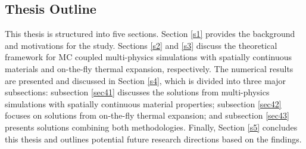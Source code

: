 \subsection{Thesis Outline}

This thesis is structured into five sections. Section \ref{s1} provides the background and motivations for the study. Sections \ref{s2} and \ref{s3} discuss the theoretical framework for MC coupled multi-physics simulations with spatially continuous materials and on-the-fly thermal expansion, respectively. The numerical results are presented and discussed in Section \ref{s4}, which is divided into three major subsections: subsection \ref{sec41} discusses the solutions from multi-physics simulations with spatially continuous material properties; subsection \ref{sec42} focuses on solutions from on-the-fly thermal expansion; and subsection \ref{sec43} presents solutions combining both methodologies. Finally, Section \ref{s5} concludes this thesis and outlines potential future research directions based on the findings.